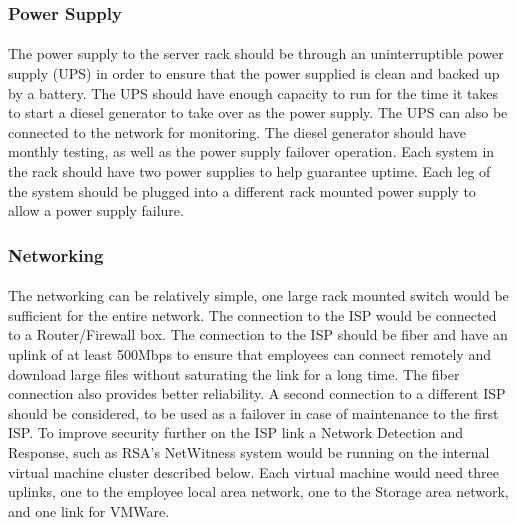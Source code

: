 \documentclass{article}
\begin{document}
\subsubsection{Power Supply}
\paragraph{}
The power supply to the server rack should be through an uninterruptible power supply (UPS) in order to ensure that the power supplied is clean and backed up by a battery.
The UPS should have enough capacity to run for the time it takes to start a diesel generator to take over as the power supply.
The UPS can also be connected to the network for monitoring.  
The diesel generator should have monthly testing, as well as the power supply failover operation.
Each system in the rack should have two power supplies to help guarantee uptime.
Each leg of the system should be plugged into a different rack mounted power supply to allow a power supply failure.
 
\subsubsection{Networking}
\paragraph{}
The networking can be relatively simple, one large rack mounted switch would be sufficient for the entire network.
The connection to the ISP would be connected to a Router/Firewall box.
The connection to the ISP should be fiber and have an uplink of at least 500Mbps to ensure that employees can connect remotely and download large files without saturating the link for a long time.
The fiber connection also provides better reliability.
A second connection to a different ISP should be considered, to be used as a failover in case of maintenance to the first ISP.
To improve security further on the ISP link a Network Detection and Response, such as RSA's NetWitness system would be running on the internal virtual machine cluster described below.
Each virtual machine would need three uplinks, one to the employee local area network, one to the Storage area network, and one link for VMWare.
\end{document}

